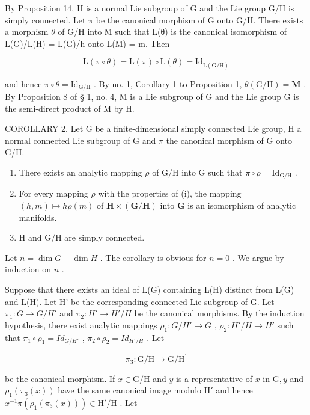 By Proposition 14, H is a normal Lie subgroup of G and the Lie group G/H is simply connected. Let \(\pi\) be the canonical morphism of G onto G/H. There exists a morphism \(\theta\) of G/H into M such that L(θ) is the canonical isomorphism of L(G)/L(H) = L(G)/h onto L(M) = m. Then

\[
\mathrm{L} (\pi \circ \theta) = \mathrm{L} (\pi) \circ \mathrm{L} (\theta) = \mathrm{Id} _ {\mathrm{L} (\mathrm{G} / \mathrm{H})}
\]

and hence \(\pi \circ \theta = \mathrm{Id}_{\mathrm{G}/\mathrm{H}}\) . By no. 1, Corollary 1 to Proposition 1, \(\theta (\mathrm{G / H}) = \mathbf{M}\) . By Proposition 8 of § 1, no. 4, M is a Lie subgroup of G and the Lie group G is the semi-direct product of M by H.

COROLLARY 2. Let G be a finite-dimensional simply connected Lie group, H a normal connected Lie subgroup of G and \(\pi\) the canonical morphism of G onto G/H.

\begin{enumerate}
\def\labelenumi{(\roman{enumi})}
\item
  There exists an analytic mapping \(\rho\) of G/H into G such that \(\pi \circ \rho = \mathrm{Id}_{\mathrm{G / H}}\) .
\item
  For every mapping \(\rho\) with the properties of (i), the mapping \((h, m) \mapsto h\rho(m)\) of \(\mathbf{H} \times (\mathbf{G}/\mathbf{H})\) into \(\mathbf{G}\) is an isomorphism of analytic manifolds.
\item
  H and G/H are simply connected.
\end{enumerate}

Let \(n = \dim G - \dim H\) . The corollary is obvious for \(n = 0\) . We argue by induction on \(n\) .

Suppose that there exists an ideal of L(G) containing L(H) distinct from L(G) and L(H). Let H' be the corresponding connected Lie subgroup of G. Let \(\pi_{1}: G \to G/H'\) and \(\pi_{2}: H' \to H'/H\) be the canonical morphisms. By the induction hypothesis, there exist analytic mappings \(\rho_{1}: G/H' \to G\) , \(\rho_{2}: H'/H \to H'\) such that \(\pi_{1} \circ \rho_{1} = Id_{G/H'}\) , \(\pi_{2} \circ \rho_{2} = Id_{H'/H}\) . Let

\[
\pi_ {3} \colon \mathrm{G} / \mathrm{H} \rightarrow \mathrm{G} / \mathrm{H} ^ {\prime}
\]

be the canonical morphism. If \(x \in \mathrm{G} / \mathrm{H}\) and \(y\) is a representative of \(x\) in \(\mathrm{G}, y\) and \(\rho_1(\pi_3(x))\) have the same canonical image modulo \(\mathrm{H}'\) and hence \(x^{-1}\pi (\rho_1(\pi_3(x))) \in \mathrm{H}' / \mathrm{H}\) . Let

